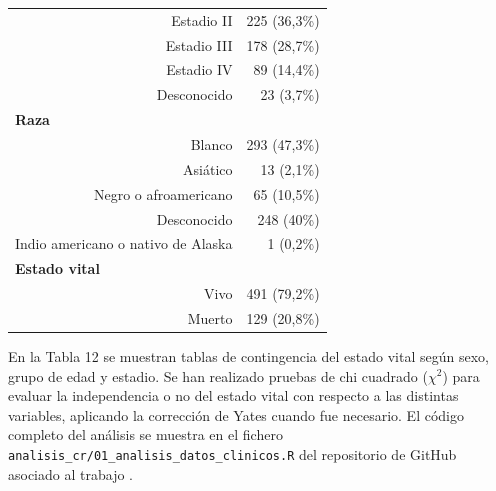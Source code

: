 \begin{table}[H]
\begin{tabular}{rr}
		Estadio II                                 & 225 (36,3\%)                                              \\
		Estadio III                                & 178 (28,7\%)                                              \\
		Estadio IV                                 & 89 (14,4\%)                                               \\
		Desconocido                                & 23 (3,7\%)                                                \\ \hline
		\multicolumn{1}{l}{\textbf{Raza}}          &                                                           \\
		Blanco                                     & 293 (47,3\%)                                              \\
		Asiático                                   & 13 (2,1\%)                                                \\
		Negro o afroamericano                      & 65 (10,5\%)                                               \\
		Desconocido                                & 248 (40\%)                                                \\
		Indio americano o nativo de Alaska         & 1 (0,2\%)                                                 \\ \hline
		\multicolumn{1}{l}{\textbf{Estado vital}}  &                                                           \\
		Vivo                                       & 491 (79,2\%)                                              \\
		Muerto                                     & 129 (20,8\%)                                              \\ \hline
	\end{tabular}
\end{table}

En la Tabla 12 se muestran tablas de contingencia del estado vital según sexo, grupo de edad y estadio. Se han realizado pruebas de chi cuadrado ($\chi^2$) \cite{Pearson1900} para evaluar la independencia o no del estado vital con respecto a las distintas variables, aplicando la corrección de Yates \cite{Yates1934} cuando fue necesario. El código completo del análisis se muestra en el fichero \texttt{analisis\_cr/01\_analisis\_datos\_clinicos.R} del repositorio de GitHub asociado al trabajo \cite{Redondo-Sanchez2020}.\\

